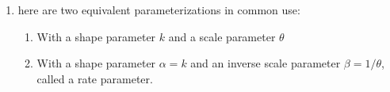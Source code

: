 \begin{enumerate}
    \item here are two equivalent parameterizations in common use:
    \begin{enumerate}
        \item With a shape parameter $k$ and a scale parameter $\theta$

        \item With a shape parameter ${\displaystyle \alpha =k}$ and an inverse scale parameter ${\displaystyle \beta =1/\theta }$, called a rate parameter.

    \end{enumerate}

\end{enumerate}




































